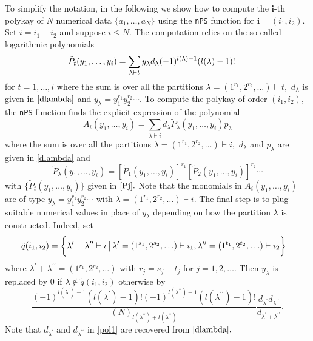 To simplify the notation, in the following we show how to compute the \(\boldsymbol{i}\)-th polykay of \(N\) numerical data \(\{a_1, \ldots, a_N\}\) using the \texttt{nPS} function for \(\boldsymbol{i} = (i_1, i_2)\). Set \(i=i_1+i_2\) and suppose \(i \leq N.\) The computation relies on the so-called logarithmic polynomials
\begin{equation}\label{Pj}
\hskip-0.5cm \tilde{P}_{t}(y_1, \ldots, y_i) =  \sum_{\lambda \vdash t}  y_{\lambda} d_{\lambda} 
(-1)^{l(\lambda)-1} (l(\lambda)-1)! 
\end{equation}
for \(t=1, \ldots, i\) where the sum is over all the partitions \(\lambda=(1^{r_1},2^{r_2},\ldots) \vdash t,\) \(d_{\lambda}\) is given in \(\eqref{dlambda}\) and \(y_{\lambda} = y_1^{r_1} y_2^{r_2} \cdots.\) To compute the polykay of order \((i_1, i_2)\), the \texttt{nPS} function finds the explicit expression of the polynomial
\begin{equation}\label{Qi2}
A_i (y_1, \ldots, y_i) = \sum_{\lambda \vdash i} d_{\lambda} \tilde{P}_{\lambda}(y_1, \ldots, y_i) p_{\lambda} 
\end{equation}
where the sum is over all the partitions \(\lambda=(1^{r_1},2^{r_2},\ldots) \vdash i,\) \(d_{\lambda}\) and \(p_{\lambda}\) are given in \eqref{dlambda} and
\[\tilde{P}_{\lambda}(y_1, \ldots, y_i)  = [\tilde{P}_{1}(y_1, \ldots, y_i)]^{r_1} [\tilde{P}_{2}(y_1, \ldots, y_i)]^{r_2} \cdots\]
with \(\{\tilde{P}_{t}(y_1, \ldots, y_i)\}\) given in \(\eqref{Pj}.\) Note that the monomials in \(A_i (y_1, \ldots, y_i)\) are of type \(y_{\lambda}= y_1^{r_1} y_2^{r_2} \cdots\) with \(\lambda = (1^{r_1}, 2^{r_2}, \ldots) \vdash i.\) The final step is to plug suitable numerical values in place of \(y_{\lambda}\) depending on how the partition \(\lambda\) is constructed. Indeed, set
\begin{equation} 
\hskip-0.5cm{\small \tilde{q}(i_1,i_2) = \bigg\{ \lambda^{\prime} + \lambda^{\prime \prime} \vdash i  \, \big| \, \lambda^{\prime}=(1^{s_1}, 2^{s_2}, \ldots) \vdash i_1, \lambda^{\prime \prime} = (1^{t_1}, 2^{t_2},\ldots) \vdash i_2\bigg\}} \!\!\!
\label{pol2}
\end{equation}
where \(\lambda^{\prime}+\lambda^{\prime \prime} = (1^{r_1}, 2^{r_2}, \ldots)\) with \(r_j = s_j + t_j\) for \(j=1,2,\ldots.\) Then
\(y_{\lambda}\) is replaced by \(0\) if \(\lambda \not \in \tilde{q}(i_1,i_2)\) otherwise by
\begin{equation} 
\frac{(-1)^{l(\lambda^{\prime})-1}(l(\lambda^{\prime})-1)! (-1)^{l(\lambda^{\prime \prime})-1}(l(\lambda^{\prime \prime})-1)!}{(N)_{l(\lambda^{\prime \prime})+l(\lambda^{\prime \prime})}} \frac{d_{\lambda^{\prime}} d_{\lambda^{\prime \prime}}}{d_{\lambda^{\prime}+\lambda^{\prime \prime}}}.
\label{pol1}
\end{equation}
Note that
\(d_{\lambda^{\prime}}\) and \(d_{\lambda^{\prime \prime}}\) in \eqref{pol1} are recovered from \(\eqref{dlambda}.\)

